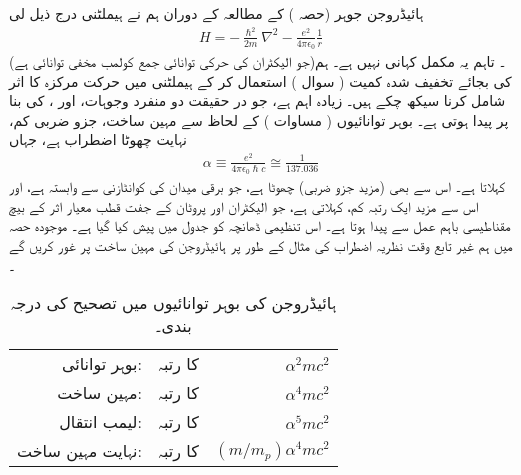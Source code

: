 ہائیڈروجن جوہر    (حصہ  ) کے مطالعہ کے دوران    ہم نے   ہیملٹنی  درج ذیل لی 
\begin{align}
H = - \frac{\hslash^2}{2m} \nabla^2 - \frac{e^2}{4 \pi \epsilon_0} \frac{1}{r}
\end{align}
(جو الیکٹران کی حرکی توانائی جمع کولمب مخفی توانائی ہے)۔ تاہم یہ مکمل کہانی نہیں ہے۔  ہم  کی بجائے تخفیف   شدہ  کمیت ( سوال  )   استعمال  کر کے  ہیملٹنی میں حرکت مرکزہ کا اثر شامل  کرنا سیکھ چکے ہیں۔  زیادہ اہم  ہے،  جو در حقیقت دو منفرد وجوہات،   اور ،  کی بنا پر پیدا ہوتی ہے۔ بوہر توانائیوں ( مساوات   )   کے لحاظ سے مہین ساخت،   جزو ضربی  کم،   نہایت چھوٹا اضطراب ہے،  جہاں 
\begin{align}
\alpha \equiv \frac{e^2}{4 \pi \epsilon_0 \hslash c} \cong \frac{1}{137.036}
\end{align} 
  کہلاتا ہے۔ اس سے بھی (مزید   جزو ضربی) چھوٹا   ہے، جو برقی میدان کی کوانٹازنی سے وابستہ ہے،  اور اس سے مزید ایک رتبہ کم،    کہلاتی ہے،  جو الیکٹران اور پروٹان کے جفت قطب  معیار اثر کے بیچ مقناطیسی باہم عمل سے پیدا ہوتا ہے۔  اس   تنظیمی  ڈھانچہ کو جدول    میں پیش کیا گیا ہے۔  موجودہ حصہ میں ہم غیر تابع  وقت نظریہ اضطراب کی مثال کے طور پر ہائیڈروجن کی مہین ساخت پر غور کریں گے ۔
\begin{table}
\caption{ہائیڈروجن کی بوہر توانائیوں میں تصحیح  کی درجہ بندی۔}
\label{جدول_غیر_مضطرب_توانائی_تصحیح_درجہ_بندی}
\centering
\begin{tabular}{rrr}
بوہر توانائی:& کا   رتبہ&$\alpha^2mc^2$\\
مہین ساخت:& کا رتبہ& $\alpha^4mc^2$\\
لیمب انتقال:&کا رتبہ&$\alpha^5mc^2$\\
نہایت مہین ساخت:&کا رتبہ&$(m/m_p)\alpha^4mc^2$
\end{tabular}
\end{table}
